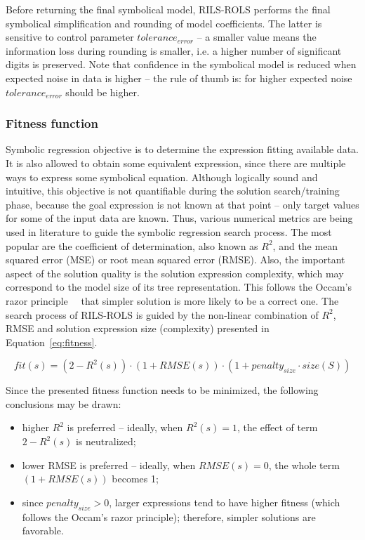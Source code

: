 \documentclass{bmcart}
\begin{document}
Before returning the final symbolical model, \textsc{RILS}-\textsc{ROLS}  performs the final symbolical simplification and rounding of model coefficients. The latter is sensitive to control parameter $tolerance_{error}$ -- a smaller value means the information loss during rounding is smaller, i.e. a higher number of significant digits is preserved. Note that confidence in the symbolical model is reduced when expected noise in data is higher -- the rule of thumb is: for higher expected noise $tolerance_{error}$ should be higher. 


\subsubsection{Fitness function}\label{sec:fitness}

Symbolic regression objective is to determine the expression fitting available data. It is also allowed to obtain some equivalent expression, since there are multiple ways to express some symbolical equation. Although logically sound and intuitive, this objective is not quantifiable during the solution search/training phase, because the goal expression is not known at that point -- only target values for some of the input data are known. Thus, various numerical metrics are being used in literature to guide the symbolic regression search process. The most popular are the coefficient of determination, also known as $R^2$, and the mean squared error (MSE) or root mean squared error (RMSE). Also, the important aspect of the solution quality is the solution expression complexity, which may correspond to the model size of its tree representation. This follows the Occam's razor principle~\cite{costa2020fast}~ that simpler solution  is more likely to be a correct one. 
The search process of \textsc{RILS}-\textsc{ROLS}  is guided by the non-linear combination of $R^2$, RMSE and solution expression size (complexity) presented in Equation~\ref{eq:fitness}. 

\begin{equation}
	\label{eq:fitness}
	fit(s) = (2-R^2(s)) \cdot (1+RMSE(s)) \cdot (1+penalty_{size} \cdot size(S))
\end{equation}

Since the presented fitness function needs to be minimized, the following conclusions may be drawn:
\begin{itemize}
	\item higher $R^2$ is preferred -- ideally, when $R^2(s)=1$, the effect of term $2-R^2(s)$ is neutralized; %
	\item lower RMSE is preferred -- ideally, when $RMSE(s)=0$, the whole term $(1+RMSE(s))$ becomes 1;
	\item since $penalty_{size} > 0$, larger expressions tend to have higher fitness (which follows the Occam's razor principle); therefore, simpler solutions are favorable. 
\end{itemize}
\end{document}

